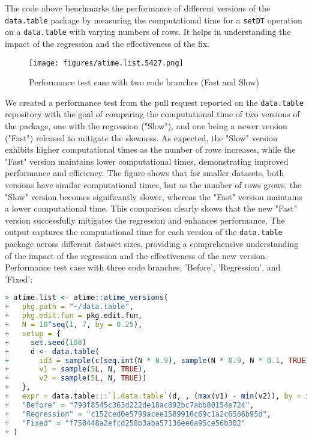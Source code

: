 \noindent The code above benchmarks the performance of different versions of the \texttt{data.table} package by measuring the computational time for a \texttt{setDT} operation on a \texttt{data.table} with varying numbers of rows. It helps in understanding the impact of the regression and the effectiveness of the fix. \\


\begin{figure}[H]
    \centering
    \texttt{[image: figures/atime.list.5427.png]}
     \caption{Performance test case with two code branches (Fast and Slow)}
    \label{fig:label3}
\end{figure}

\noindent \noindent We created a performance test from the pull request reported on the \texttt{data.table} repository with the goal of comparing the computational time of two versions of the package, one with the regression ("Slow"), and one being a newer version ("Fast") released to mitigate the slowness. As expected, the "Slow" version exhibits higher computational times as the number of rows increases, while the "Fast" version maintains lower computational times, demonstrating improved performance and efficiency. The figure shows that for smaller datasets, both versions have similar computational times, but as the number of rows grows, the "Slow" version becomes significantly slower, whereas the "Fast" version maintains a lower computational time. This comparison clearly shows that the new "Fast" version successfully mitigates the regression and enhances performance. The output captures the computational time for each version of the \texttt{data.table} package across different dataset sizes, providing a comprehensive understanding of the impact of the regression and the effectiveness of the new version.\\

\noindent Performance test case with three code branches: 'Before', 'Regression', and 'Fixed': \\

\begin{lstlisting}[language=R]
> atime.list <- atime::atime_versions(
+   pkg.path = "~/data.table",
+   pkg.edit.fun = pkg.edit.fun,
+   N = 10^seq(1, 7, by = 0.25),
+   setup = { 
+     set.seed(108)
+     d <- data.table(
+       id3 = sample(c(seq.int(N * 0.9), sample(N * 0.9, N * 0.1, TRUE))),
+       v1 = sample(5L, N, TRUE),
+       v2 = sample(5L, N, TRUE))
+   },
+   expr = data.table:::`[.data.table`(d, , (max(v1) - min(v2)), by = id3),
+   "Before" = "793f8545c363d222de18ac892bc7abb80154e724",
+   "Regression" = "c152ced0e5799acee1589910c69c1a2c6586b95d",
+   "Fixed" = "f750448a2efcd258b3aba57136ee6a95ce56b302"
+ )
\end{lstlisting}

